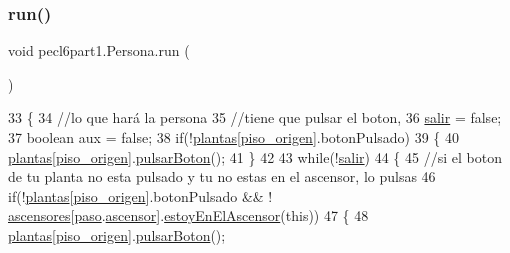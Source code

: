 \subsubsection{\texorpdfstring{run()}{run()}}
{\footnotesize\ttfamily void pecl6part1.\+Persona.\+run (\begin{DoxyParamCaption}{ }\end{DoxyParamCaption})\hspace{0.3cm}{\ttfamily [inline]}}


\begin{DoxyCode}
33     \{
34         \textcolor{comment}{//lo que hará la persona}
35         \textcolor{comment}{//tiene que pulsar el boton, }
36         \mbox{\hyperlink{classpecl6part1_1_1_persona_aaf35f4def1c5244a3e8d464a88e66243}{salir}} = \textcolor{keyword}{false};
37         \textcolor{keywordtype}{boolean} aux = \textcolor{keyword}{false};
38         \textcolor{keywordflow}{if}(!\mbox{\hyperlink{classpecl6part1_1_1_persona_aa5841c74449c09b7aa8e0c646365228d}{plantas}}[\mbox{\hyperlink{classpecl6part1_1_1_persona_a6a8187e7b1c423eb263a336a573d634f}{piso\_origen}}].botonPulsado)
39         \{
40             \mbox{\hyperlink{classpecl6part1_1_1_persona_aa5841c74449c09b7aa8e0c646365228d}{plantas}}[\mbox{\hyperlink{classpecl6part1_1_1_persona_a6a8187e7b1c423eb263a336a573d634f}{piso\_origen}}].\mbox{\hyperlink{classpecl6part1_1_1_planta_a064fad4a92526db34d23f3cd8cbdbee8}{pulsarBoton}}();
41         \}
42         
43         \textcolor{keywordflow}{while}(!\mbox{\hyperlink{classpecl6part1_1_1_persona_aaf35f4def1c5244a3e8d464a88e66243}{salir}})
44         \{
45             \textcolor{comment}{//si el boton de tu planta no esta pulsado y tu no estas en el ascensor, lo pulsas}
46             \textcolor{keywordflow}{if}(!\mbox{\hyperlink{classpecl6part1_1_1_persona_aa5841c74449c09b7aa8e0c646365228d}{plantas}}[\mbox{\hyperlink{classpecl6part1_1_1_persona_a6a8187e7b1c423eb263a336a573d634f}{piso\_origen}}].botonPulsado && !
      \mbox{\hyperlink{classpecl6part1_1_1_persona_a4a61953407b3ad73a3dfcc9314f36d73}{ascensores}}[\mbox{\hyperlink{classpecl6part1_1_1_persona_a5bad8cf9009a1412b98f0585761ba19a}{paso}}.\mbox{\hyperlink{classpecl6part1_1_1_monitor_a6a25fb9f29d59a43156c1c2413d3b5f0}{ascensor}}].\mbox{\hyperlink{classpecl6part1_1_1_ascensor_af9df13b79ebb74d8db4277d32c7c2bf5}{estoyEnElAscensor}}(\textcolor{keyword}{this}))
47             \{
48                 \mbox{\hyperlink{classpecl6part1_1_1_persona_aa5841c74449c09b7aa8e0c646365228d}{plantas}}[\mbox{\hyperlink{classpecl6part1_1_1_persona_a6a8187e7b1c423eb263a336a573d634f}{piso\_origen}}].\mbox{\hyperlink{classpecl6part1_1_1_planta_a064fad4a92526db34d23f3cd8cbdbee8}{pulsarBoton}}();

\end{DoxyCode}
